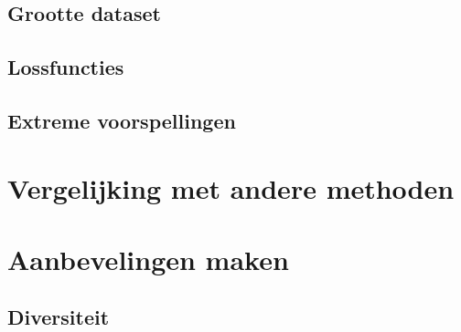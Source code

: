 \subsection{Grootte dataset}


\subsection{Lossfuncties}

\subsection{Extreme voorspellingen}




\section{Vergelijking met andere methoden}

\section{Aanbevelingen maken}

\subsection{Diversiteit}



